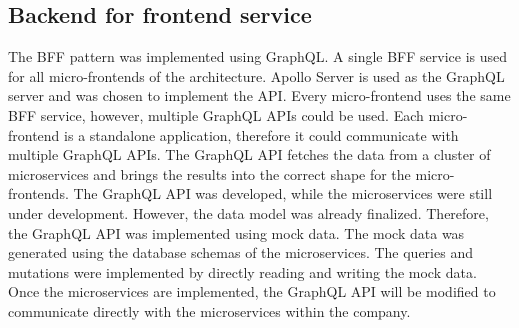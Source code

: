 \subsection{Backend for frontend service}\label{subsection:background:prototypical-implemenation:bff}

The \ac{BFF} pattern was implemented using GraphQL. A single \ac{BFF} service is used for all micro-frontends of the architecture. Apollo Server is used as the GraphQL server and was chosen to implement the \ac{API}. Every micro-frontend uses the same \ac{BFF} service, however, multiple GraphQL \acp{API} could be used. Each micro-frontend is a standalone application, therefore it could communicate with multiple GraphQL \acp{API}.
The GraphQL \ac{API} fetches the data from a cluster of microservices and brings the results into the correct shape for the micro-frontends. The GraphQL \ac{API} was developed, while the microservices were still under development. However, the data model was already finalized. Therefore, the GraphQL \ac{API} was implemented using mock data. The mock data was generated using the database schemas of the microservices. The queries and mutations were implemented by directly reading and writing the mock data. Once the microservices are implemented, the GraphQL \ac{API} will be modified to communicate directly with the microservices within the company.
